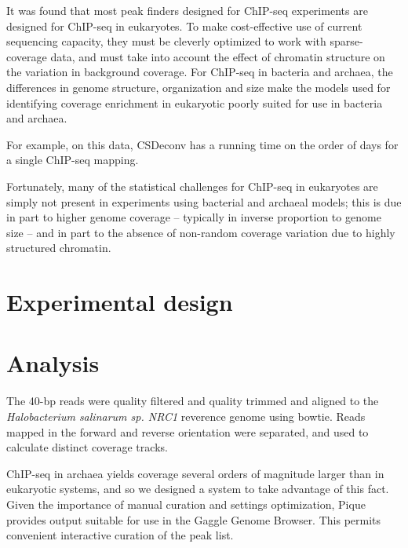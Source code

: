\documentclass{article}
\begin{document}
\begin{abstract}
\end{abstract}

It was found that most peak finders designed for ChIP-seq experiments
are designed for ChIP-seq in eukaryotes. To make cost-effective use of
current sequencing capacity, they must be cleverly optimized to work
with sparse-coverage data, and must take into account the effect of
chromatin structure on the variation in background coverage. For
ChIP-seq in bacteria and archaea, the differences in genome structure,
organization and size make the models used for identifying coverage
enrichment in eukaryotic poorly suited for use in bacteria and
archaea. 

For example, on this data, CSDeconv has a running time on the order of
days for a single ChIP-seq mapping.


Fortunately, many of the statistical challenges for ChIP-seq in
eukaryotes are simply not present in experiments using bacterial and
archaeal models; this is due in part to higher genome coverage --
typically in inverse proportion to genome size -- and in part to the
absence of non-random coverage variation due to highly structured
chromatin.

\section{Experimental design}



\section{Analysis}


The 40-bp reads were quality filtered and quality trimmed and aligned
to the {\em Halobacterium salinarum sp. NRC1} reverence genome using
bowtie. Reads mapped in the forward and reverse orientation were
separated, and used to calculate distinct coverage tracks.


ChIP-seq in archaea yields coverage several orders of magnitude larger
than in eukaryotic systems, and so we designed a system to take
advantage of this fact. Given the importance of manual curation and
settings optimization, Pique provides output suitable for use in the
Gaggle Genome Browser. This permits convenient interactive curation of
the peak list. 
\end{document}

